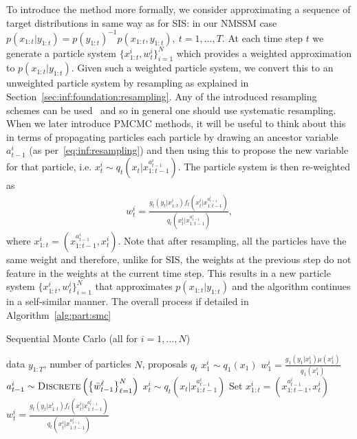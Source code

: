 To introduce the \smc method more formally, we consider approximating a sequence of target distributions
in same way as for SIS: in our NMSSM
 case $p(x_{1:t}|y_{1:t}) = p(y_{1:t})^{-1} p(x_{1:t},y_{1:t}), ~t=1,\ldots,T$. 
At each time step $t$ we 
generate a particle system
$\{x_{1:t}^i,w_{t}^i\}_{i=1}^N$ which provides a weighted approximation  to $p(x_{1:t}|y_{1:t})$. Given such a 
weighted particle system, we convert this to an unweighted particle system by resampling as explained
in Section~\ref{sec:inf:foundation:resampling}.  Any of the introduced resampling schemes can be 
used~\citep[Section 4.1]{andrieu2010particle}
and so in general one should use systematic resampling.
When we later introduce PMCMC methods, it will
be useful to think about this in terms of propagating particles each particle by drawing an 
ancestor variable $a_{t-1}^i$ (as per~\eqref{eq:inf:resampling}) and then using this to propose the new
variable for that particle, i.e. $x_t^i \sim q_t(x_t | x_{1:t-1}^{a_{t-1}^i})$.  The particle system is then
re-weighted as
\begin{align}
\label{eq:smcweights}
w_t^i = \frac{g_t(y_t|x_{1:t}^i) f_t(x_t^i | x_{1:t-1}^{a_{t-1}^i})}{q_t(x_t^i|x_{1:t-1}^{a_{t-1}^i})},
\end{align}
where $x_{1:t}^i = (x_{1:t-1}^{a_{t-1}^i},x_t^i)$.   Note that after resampling,
all the particles have the same weight and therefore, unlike for SIS, the weights at the previous step
do not feature in the weights at the current time step.
This results in a new particle system $\{x_{1:t}^i,w_t^i\}_{i=1}^N$ that approximates $p(x_{1:t}|y_{1:t})$
and the algorithm continues in a self-similar manner.
The overall process if detailed in Algorithm~\ref{alg:part:smc}

\begin{algorithm}[tb]
	\caption{Sequential Monte Carlo \hfill {\small (all for $i=1,\ldots,N$)}}
	\label{alg:part:smc}
	\begin{spacing}{1.2}
		\begin{algorithmic}[1]
			\renewcommand{\algorithmicrequire}{\textbf{Inputs:}}
			\renewcommand{\algorithmicensure}{\textbf{Outputs:}}				 
			\Require  data $y_{1:T}$, number of particles $N$, proposals $q_t$
			\State $x_1^i \sim q_1(x_1)$
			\State $w_1^i = \frac{g_1(y_1|x_1^i) \mu(x_1^i)}{q_1(x_1^i)}$
			\State $a_{t-1}^i \sim \operatorname*{\textsc{Discrete}}\left(\left\{\bar w_{t-1}^{\ell}\right\}_{\ell=1}^N\right)$%
			\State $x_t^i \sim q_t(x_t | x_{1:t-1}^{a_{t-1}^i})$ 
			\State Set $x_{1:t}^i = (x_{1:t-1}^{a_{t-1}^i},x_t^i)$
			\State $w_t^i = \frac{g_t(y_t|x_{1:t}^i) f_t(x_t^i | x_{1:t-1}^{a_{t-1}^i})}{q_t(x_t^i|x_{1:t-1}^{a_{t-1}^i})}$
			\EndFor
		\end{algorithmic}
	\end{spacing}
\end{algorithm}

